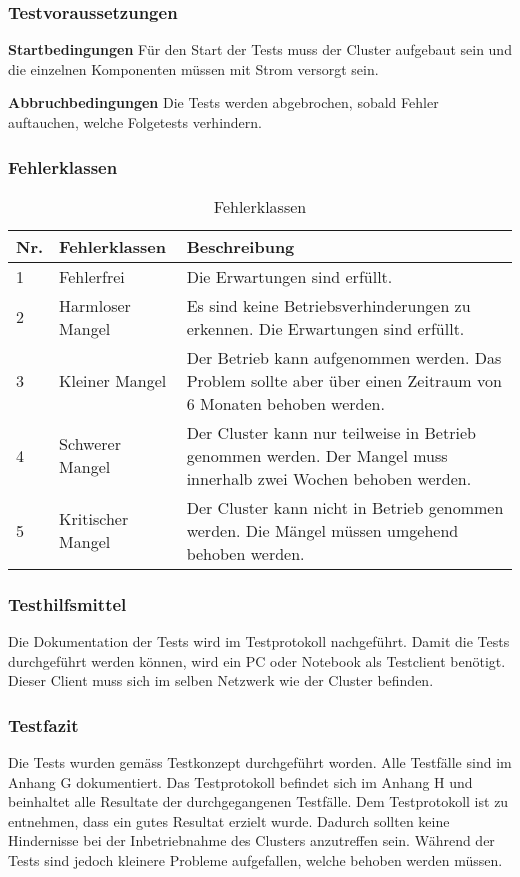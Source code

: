 \subsubsection{Testvoraussetzungen}
\textbf{Startbedingungen}\newline
Für den Start der Tests muss der Cluster aufgebaut sein und die einzelnen Komponenten müssen mit Strom versorgt sein. 

\textbf{Abbruchbedingungen}\newline
Die Tests werden abgebrochen, sobald Fehler auftauchen, welche Folgetests verhindern.

\subsubsection{Fehlerklassen}
\begin{table}[H]
\centering
\begin{tabular}{p{1cm}p{4cm}p{11cm}}
\hline
\rowcolor{heading} \textbf{Nr.} & \textbf{Fehlerklassen} & \textbf{Beschreibung} \\\hline
1 & Fehlerfrei & Die Erwartungen sind erfüllt.  \\\hline
2 & Harmloser Mangel & Es sind keine Betriebsverhinderungen zu erkennen. Die Erwartungen sind erfüllt. \\\hline
3 & Kleiner Mangel & Der Betrieb kann aufgenommen werden. Das Problem sollte aber über einen Zeitraum von 6 Monaten behoben werden.  \\\hline
4 & Schwerer Mangel & Der Cluster kann nur teilweise in Betrieb genommen werden. Der Mangel muss innerhalb zwei Wochen behoben werden. \\\hline
5 & Kritischer Mangel & Der Cluster kann nicht in Betrieb genommen werden. Die Mängel müssen umgehend behoben werden. \\\hline
\end{tabular}
\caption{Fehlerklassen}
\end{table}

\subsubsection{Testhilfsmittel}
Die Dokumentation der Tests wird im Testprotokoll nachgeführt. Damit die Tests durchgeführt werden können, wird ein PC oder Notebook als Testclient benötigt. Dieser Client muss sich im selben Netzwerk wie der Cluster befinden.


\subsubsection{Testfazit}
Die Tests wurden gemäss Testkonzept durchgeführt worden. Alle Testfälle sind im Anhang G dokumentiert. Das Testprotokoll befindet sich im Anhang H und beinhaltet alle Resultate der durchgegangenen Testfälle. Dem Testprotokoll ist zu entnehmen, dass ein gutes Resultat erzielt wurde. Dadurch sollten keine Hindernisse bei der Inbetriebnahme des Clusters anzutreffen sein. Während der Tests sind jedoch kleinere Probleme aufgefallen, welche behoben werden müssen.\newline

